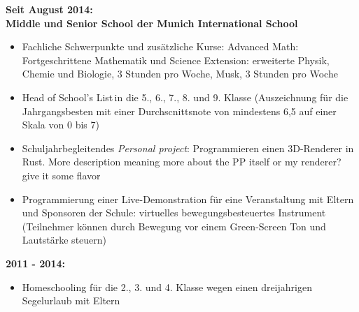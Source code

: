 \documentclass[12pt]{article}
\newcommand{\ask}[1]{{\color{red}#1}}
\begin{document}
  \textbf{Seit August 2014: \\
    Middle und Senior School der Munich International School
  }

  \vspace{-10pt}
  \begin{itemize}
    \itemsep3pt
  \item Fachliche Schwerpunkte und zus{\"a}tzliche Kurse: \glqq Advanced
    Math\grqq: Fortgeschrittene Mathematik und \glqq Science Extension\grqq:
    erweiterte Physik, Chemie und Biologie, 3 Stunden pro Woche, Musk, 3 Stunden
    pro Woche

  \item \glqq Head of School's List\grqq \,in die 5., 6., 7., 8. und 9. Klasse
    (Auszeichnung f{\"u}r die Jahrgangsbesten mit einer Durchscnittsnote von
    mindestens 6,5 auf einer Skala von 0 bis 7)

  \item Schuljahrbegleitendes \textit{\glqq Personal project\grqq}:
    Programmieren einen 3D-Renderer in Rust. \ask{More description meaning more
      about the PP itself or my renderer?} \ask{give it some flavor}

  \item Programmierung einer Live-Demonstration f{\"u}r eine Veranstaltung mit
    Eltern und Sponsoren der Schule: virtuelles bewegungsbesteuertes Instrument
    (Teilnehmer k{\"o}nnen durch Bewegung vor einem Green-Screen Ton und
    Lautst{\"a}rke steuern)

  \end{itemize}

  \textbf{2011 - 2014:
  }
  \vspace{-10pt}
  \begin{itemize}
    \itemsep3pt
  \item Homeschooling f{\"u}r die 2., 3. und 4. Klasse wegen einen dreijahrigen Segelurlaub mit Eltern

  \end{itemize}

\end{document}

